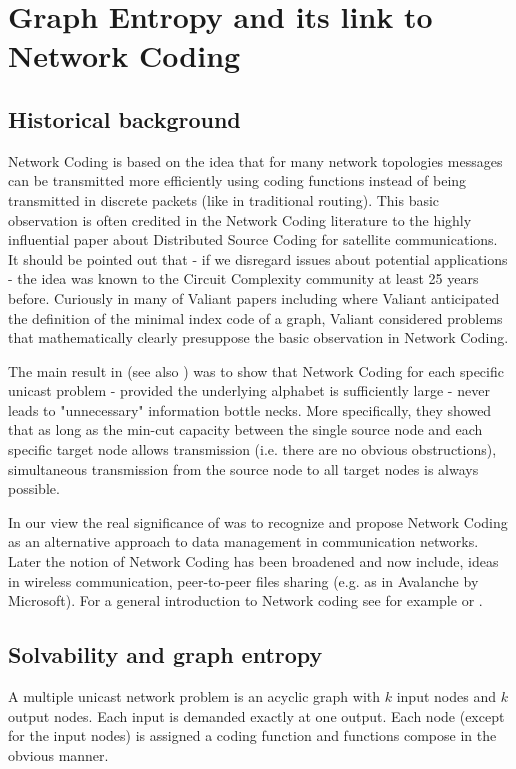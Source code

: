 \documentclass[12pt]{article}
\begin{document}
\section{Graph Entropy and its link to Network Coding}
\subsection{Historical background}
Network Coding is based on the idea that  for many network topologies messages can be transmitted more efficiently using coding functions instead of being transmitted in discrete packets
(like in traditional routing). 
This basic observation is often credited in the Network Coding literature to the highly influential paper \cite{Satellite} about Distributed Source Coding for satellite communications.  It should be pointed out
that - if we disregard issues about potential applications - the idea was known to the Circuit Complexity community at least 25 years before.  Curiously in many of Valiant papers including \cite{Valorg} where Valiant anticipated the definition of the minimal index code of a graph, Valiant  considered problems that mathematically clearly presuppose the basic observation in Network Coding. 

The main result in \cite{Satellite} (see also \cite{BR1}) was to show that Network Coding for each specific unicast problem - provided the underlying alphabet is sufficiently large - never leads to "unnecessary" information bottle necks.  More specifically, they showed that as long as the min-cut capacity  between the single source node and each specific target node allows transmission (i.e. there are no obvious obstructions), simultaneous  transmission from the source node to all target nodes is always possible. 

In our view the real significance of \cite{Satellite} was to recognize and propose Network Coding as an alternative approach to data management in communication networks. Later the notion of Network Coding has been broadened and now include, ideas in wireless communication, peer-to-peer files sharing (e.g. as in Avalanche by Microsoft).  For a general introduction to Network coding see
for example \cite{intro1} or \cite{intro2}.

\subsection{Solvability and graph entropy}
A multiple unicast network problem is an acyclic graph with $k$ input nodes and $k$ output nodes. Each input is demanded exactly at one output.  Each node (except for the input nodes) is assigned a coding function and functions compose in the obvious manner. 
\end{document}
